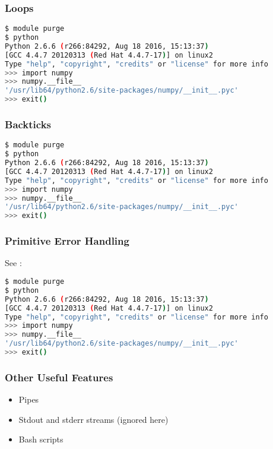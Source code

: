 \documentclass{beamer}
\begin{document}
\begin{frame}[fragile]
\frametitle{Loops}
\begingroup
\scriptsize
\begin{lstlisting}[backgroundcolor = \color{codegray}, language = Bash, showstringspaces=false]
$ module purge
$ python
Python 2.6.6 (r266:84292, Aug 18 2016, 15:13:37)
[GCC 4.4.7 20120313 (Red Hat 4.4.7-17)] on linux2
Type "help", "copyright", "credits" or "license" for more info
>>> import numpy
>>> numpy.__file__
'/usr/lib64/python2.6/site-packages/numpy/__init__.pyc'
>>> exit()
\end{lstlisting}
\endgroup
\end{frame}


\begin{frame}[fragile]
\frametitle{Backticks}
\begingroup
\scriptsize
\begin{lstlisting}[backgroundcolor = \color{codegray}, language = Bash, showstringspaces=false]
$ module purge
$ python
Python 2.6.6 (r266:84292, Aug 18 2016, 15:13:37)
[GCC 4.4.7 20120313 (Red Hat 4.4.7-17)] on linux2
Type "help", "copyright", "credits" or "license" for more info
>>> import numpy
>>> numpy.__file__
'/usr/lib64/python2.6/site-packages/numpy/__init__.pyc'
>>> exit()
\end{lstlisting}
\endgroup
\end{frame}


\begin{frame}[fragile]
\frametitle{Primitive Error Handling}
See : 
\begingroup
\scriptsize
\begin{lstlisting}[backgroundcolor = \color{codegray}, language = Bash, showstringspaces=false]
$ module purge
$ python
Python 2.6.6 (r266:84292, Aug 18 2016, 15:13:37)
[GCC 4.4.7 20120313 (Red Hat 4.4.7-17)] on linux2
Type "help", "copyright", "credits" or "license" for more info
>>> import numpy
>>> numpy.__file__
'/usr/lib64/python2.6/site-packages/numpy/__init__.pyc'
>>> exit()
\end{lstlisting}
\endgroup
\end{frame}



\begin{frame}
\frametitle{Other Useful Features}
\begin{itemize}
    \item Pipes 
    \pause
    \item Stdout and stderr streams (ignored here)
    \pause
    \item Bash scripts
    \pause
\end{itemize}
\end{frame}
\end{document}
